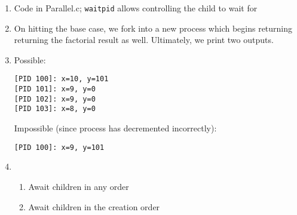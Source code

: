\documentclass[12pt, a4paper]{article}
\begin{document}
\begin{enumerate}[Q\arabic*.]
  \item Code in Parallel.c; \lstinline|waitpid| allows controlling the child to wait for

  \item On hitting the base case, we fork into a new process which begins returning returning the factorial result as well. Ultimately, we print two outputs.

  \item Possible:
    \begin{lstlisting}
[PID 100]: x=10, y=101
[PID 101]: x=9, y=0
[PID 102]: x=9, y=0
[PID 103]: x=8, y=0
    \end{lstlisting}
    Impossible (since process has decremented incorrectly):
    \begin{lstlisting}
[PID 100]: x=9, y=101
    \end{lstlisting}

  \item 
    \begin{enumerate}[(\alph*.)]
      \item Await children in any order
      \item Await children in the creation order
    \end{enumerate}
\end{enumerate}
\end{document}
